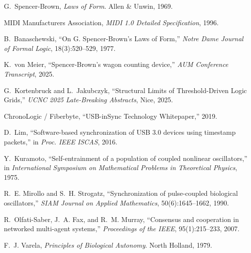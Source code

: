 \documentclass[11pt]{article}
\begin{document}
\begin{thebibliography}{99}
\setlength{\itemsep}{2pt}

G.~Spencer-Brown, \emph{Laws of Form}. Allen \& Unwin, 1969.

MIDI Manufacturers Association, \emph{MIDI 1.0 Detailed Specification}, 1996.

B.~Banaschewski, ``On G. Spencer-Brown's Laws of Form,'' \emph{Notre Dame Journal of Formal Logic}, 18(3):520--529, 1977.

K.~von Meier, ``Spencer-Brown's wagon counting device,'' \emph{AUM Conference Transcript}, 2025. %

G.~Kortenbruck and L.~Jakubczyk, ``Structural Limits of Threshold-Driven Logic Grids,'' \emph{UCNC 2025 Late-Breaking Abstracts}, Nice, 2025.

ChronoLogic / Fiberbyte, ``USB-inSync Technology Whitepaper,'' 2019. %

D.~Lim, ``Software-based synchronization of USB 3.0 devices using timestamp packets,'' in \emph{Proc. IEEE ISCAS}, 2016.

Y.~Kuramoto, ``Self-entrainment of a population of coupled nonlinear oscillators,'' in \emph{International Symposium on Mathematical Problems in Theoretical Physics}, 1975.

R.~E. Mirollo and S.~H. Strogatz, ``Synchronization of pulse-coupled biological oscillators,'' \emph{SIAM Journal on Applied Mathematics}, 50(6):1645--1662, 1990.

R.~Olfati-Saber, J.~A. Fax, and R.~M. Murray, ``Consensus and cooperation in networked multi-agent systems,'' \emph{Proceedings of the IEEE}, 95(1):215--233, 2007.

F.~J. Varela, \emph{Principles of Biological Autonomy}. North Holland, 1979.

\end{thebibliography}
\end{document}
